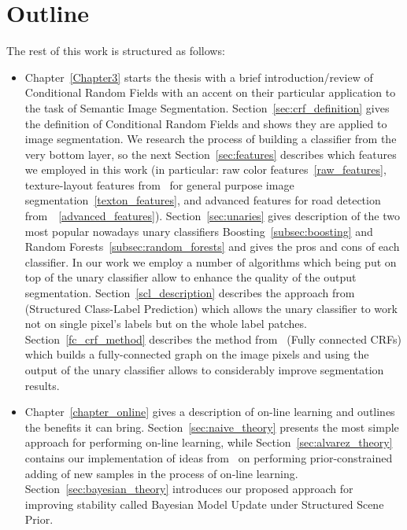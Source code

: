\section{Outline}
The rest of this work is structured as follows:
\begin{itemize}
 \item Chapter~\ref{Chapter3} starts the thesis with a brief introduction/review of Conditional Random Fields
 with an accent on their particular application to the task of Semantic Image Segmentation. Section~\ref{sec:crf_definition} gives the definition of
 Conditional Random Fields and shows they are applied to image segmentation. We research the process of building a classifier from the very bottom layer,
 so the next Section~\ref{sec:features} describes which features we employed in this work (in particular: raw color features~\ref{raw_features}, 
 texture-layout features from~\cite{Shotton2009} for general purpose image segmentation~\ref{texton_features}, 
 and advanced features for road detection from~\cite{Wojek2008}~\ref{advanced_features}). 
 Section~\ref{sec:unaries} gives description of the two most popular nowadays unary classifiers Boosting~\ref{subsec:boosting} and 
 Random Forests~\ref{subsec:random_forests} and gives the pros and cons of each classifier. In our work we employ a number of algorithms which being 
 put on top of the unary classifier allow to enhance the quality of the output segmentation. Section~\ref{scl_description} describes the approach
 from~\cite{Kontschieder2011} (Structured Class-Label Prediction) which allows the unary classifier to work not on single pixel's labels but on the whole
 label patches. Section~\ref{fc_crf_method} describes the method from~\cite{Krahenbuhl2011} (Fully connected CRFs) which builds a fully-connected graph
 on the image pixels and using the output of the unary classifier allows to considerably improve segmentation results.
 
 \item Chapter~\ref{chapter_online} gives a description of on-line learning and outlines the benefits it can bring. Section~\ref{sec:naive_theory} presents
 the most simple approach for performing on-line learning, while Section~\ref{sec:alvarez_theory} contains our implementation of ideas from~\cite{Alvarez2012}
 on performing prior-constrained adding of new samples in the process of on-line learning. Section~\ref{sec:bayesian_theory} introduces our proposed
 approach for improving stability called Bayesian Model Update under Structured Scene Prior.
 

\end{itemize}
